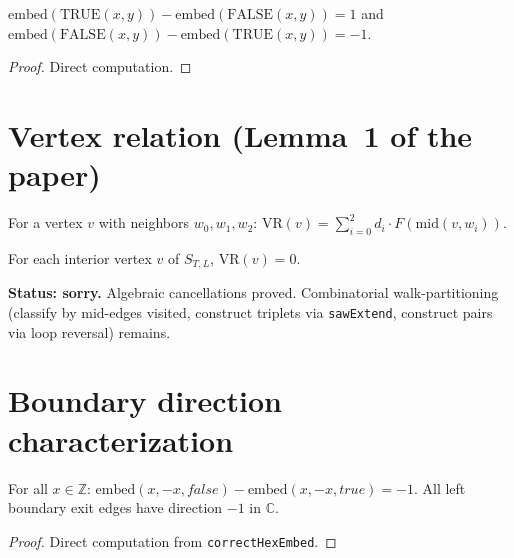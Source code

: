 \begin{lemma}
\begin{lemma}\label{lem:same_cell_dir}
\leanok
{}
  $\mathrm{embed}(\mathrm{TRUE}(x,y)) - \mathrm{embed}(\mathrm{FALSE}(x,y)) = 1$ and
  $\mathrm{embed}(\mathrm{FALSE}(x,y)) - \mathrm{embed}(\mathrm{TRUE}(x,y)) = -1$.
\end{lemma}
\begin{proof}\leanok Direct computation. \end{proof}

\section{Vertex relation (Lemma~1 of the paper)}

\begin{definition}\label{def:vertex_contrib}
  For a vertex $v$ with neighbors $w_0, w_1, w_2$:
  $\mathrm{VR}(v) = \sum_{i=0}^{2} d_i \cdot F(\mathrm{mid}(v, w_i))$.
\end{definition}

\begin{theorem}\label{lem:vertex_relation}
  For each interior vertex $v$ of $S_{T,L}$, $\mathrm{VR}(v) = 0$.

  \textbf{Status: sorry.} Algebraic cancellations proved. Combinatorial
  walk-partitioning (classify by mid-edges visited, construct triplets
  via \texttt{sawExtend}, construct pairs via loop reversal) remains.
\end{theorem}

\section{Boundary direction characterization}

\begin{lemma}\label{lem:left_bdy_dir}
\leanok
{}
  For all $x \in \mathbb{Z}$:
  $\mathrm{embed}(x,-x,\mathit{false}) - \mathrm{embed}(x,-x,\mathit{true}) = -1$.
  All left boundary exit edges have direction $-1$ in $\mathbb{C}$.
\end{lemma}
\begin{proof}\leanok Direct computation from \texttt{correctHexEmbed}. \end{proof}


\end{lemma}
